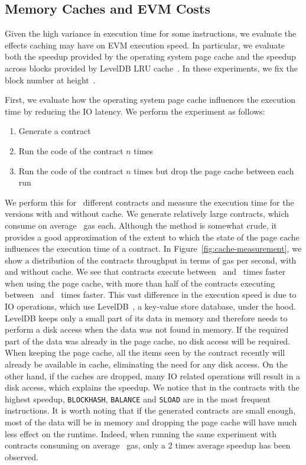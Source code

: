 \subsection{Memory Caches and EVM Costs}
\label{ssec:memory-caches}
Given the high variance in execution time for some instructions, we evaluate the effects caching may have on EVM execution speed. In particular, we evaluate both the speedup provided by the operating system page cache and the speedup across blocks provided by LevelDB LRU cache~\cite{leveldb-cache}. In these experiments, we fix the block number at height~.

 First, we evaluate how the operating system page cache influences the execution time by reducing the IO latency. We perform the experiment as follows:

\begin{enumerate}
\item Generate a contract
\item Run the code of the contract $n$ times
\item Run the code of the contract $n$ times but drop the page cache between each run
\end{enumerate}
%
We perform this for~ different contracts and measure the execution time for the versions with and without cache. We generate relatively large contracts, which consume on average~ gas each. Although the method is somewhat crude, it provides a good approximation of the extent to which the state of the page cache influences the execution time of a contract. In Figure~\ref{fig:cache-measurement}, we show a distribution of the contracts throughput in terms of gas per second, with and without cache. We see that contracts execute between~ and~ times faster when using the page cache, with more than half of the contracts executing between~ and~ times faster.
This vast difference in the execution speed is due to IO operations, which use LevelDB~\cite{ghemawat2011leveldb}, a key-value store database, under the hood. LevelDB keeps only a small part of its data in memory and therefore needs to perform a disk access when the data was not found in memory. If the required part of the data was already in the page cache, no disk access will be required. When keeping the page cache, all the items seen by the contract recently will already be available in cache, eliminating the need for any disk access. On the other hand, if the caches are dropped, many IO related operations will result in a disk access, which explains the speedup. We notice that in the contracts with the highest speedup, \lstinline{BLOCKHASH}, \lstinline{BALANCE} and \lstinline{SLOAD} are in the most frequent instructions. It is worth noting that if the generated contracts are small enough, most of the data will be in memory and dropping the page cache will have much less effect on the runtime. Indeed, when running the same experiment with contracts consuming on average~ gas, only a 2 times average speedup has been observed.
